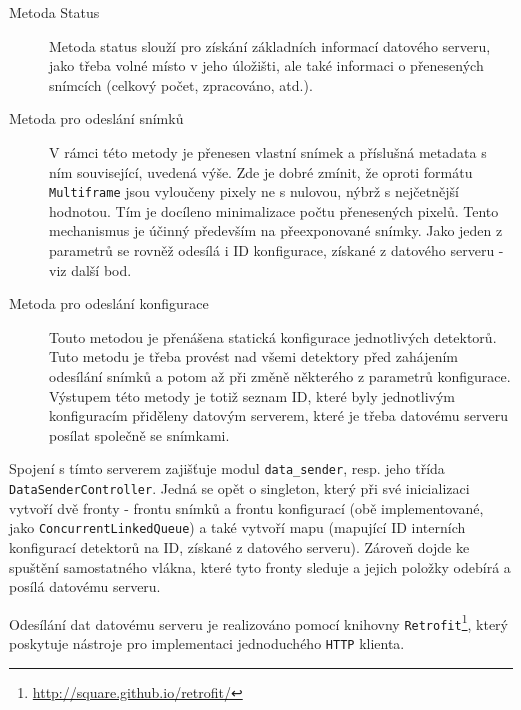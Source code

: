 \begin{description}
	\item[Metoda Status] Metoda status slouží pro získání základních informací datového serveru, jako třeba volné místo v jeho úložišti, ale také informaci o přenesených snímcích (celkový počet, zpracováno, atd.).
	\item[Metoda pro odeslání snímků] V rámci této metody je přenesen vlastní snímek a příslušná metadata s ním související, uvedená výše. Zde je dobré zmínit, že oproti formátu \texttt{Multiframe} jsou vyloučeny pixely ne s nulovou, nýbrž s nejčetnější hodnotou. Tím je docíleno minimalizace počtu přenesených pixelů. Tento mechanismus je účinný především na přeexponované snímky. Jako jeden z parametrů se rovněž odesílá i ID konfigurace, získané z datového serveru - viz další bod.
	\item[Metoda pro odeslání konfigurace] Touto metodou je přenášena statická konfigurace jednotlivých detektorů. Tuto metodu je třeba provést nad všemi detektory před zahájením odesílání snímků a potom až při změně některého z parametrů konfigurace. Výstupem této metody je totiž seznam ID, které byly jednotlivým konfiguracím přiděleny datovým serverem, které je třeba datovému serveru posílat společně se snímkami.
\end{description}

Spojení s tímto serverem zajišťuje modul \texttt{data\_sender}, resp. jeho třída \texttt{DataSenderController}. Jedná se opět o singleton, který při své inicializaci vytvoří dvě fronty - frontu snímků a frontu konfigurací (obě implementované, jako \texttt{ConcurrentLinkedQueue}) a také vytvoří mapu (mapující ID interních konfigurací detektorů na ID, získané z datového serveru). Zároveň dojde ke spuštění samostatného vlákna, které tyto fronty sleduje a jejich položky odebírá a posílá datovému serveru.

Odesílání dat datovému serveru je realizováno pomocí knihovny \texttt{Retrofit}\footnote{\url{http://square.github.io/retrofit/}}, který poskytuje nástroje pro implementaci jednoduchého \texttt{HTTP} klienta.









